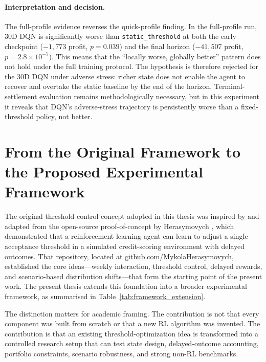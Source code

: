 \documentclass[12pt,a4paper]{article}
\begin{document}
\paragraph{Interpretation and decision.}
The full-profile evidence reverses the quick-profile finding. In the full-profile run, 30D DQN is significantly worse than \texttt{static\_threshold} at both the early checkpoint ($-1{,}773$ profit, $p = 0.039$) and the final horizon ($-41{,}507$ profit, $p = 2.8 \times 10^{-7}$). This means that the ``locally worse, globally better'' pattern does not hold under the full training protocol. The hypothesis is therefore rejected for the 30D DQN under adverse stress: richer state does not enable the agent to recover and overtake the static baseline by the end of the horizon. Terminal-settlement evaluation remains methodologically necessary, but in this experiment it reveals that DQN's adverse-stress trajectory is persistently worse than a fixed-threshold policy, not better.

\section{From the Original Framework to the Proposed Experimental Framework}

The original threshold-control concept adopted in this thesis was inspired by and adapted from the open-source proof-of-concept by Herasymovych \cite{herasymovych2019}, which demonstrated that a reinforcement learning agent can learn to adjust a single acceptance threshold in a simulated credit-scoring environment with delayed outcomes. That repository, located at \href{https://github.com/MykolaHerasymovych/Optimizing-Acceptance-Threshold-in-Credit-Scoring-using-Reinforcement-Learning}{github.com/MykolaHerasymovych}, established the core ideas---weekly interaction, threshold control, delayed rewards, and scenario-based distribution shifts---that form the starting point of the present work. The present thesis extends this foundation into a broader experimental framework, as summarised in Table~\ref{tab:framework_extension}.

The distinction matters for academic framing. The contribution is not that every component was built from scratch or that a new RL algorithm was invented. The contribution is that an existing threshold-optimization idea is transformed into a controlled research setup that can test state design, delayed-outcome accounting, portfolio constraints, scenario robustness, and strong non-RL benchmarks.
\end{document}
